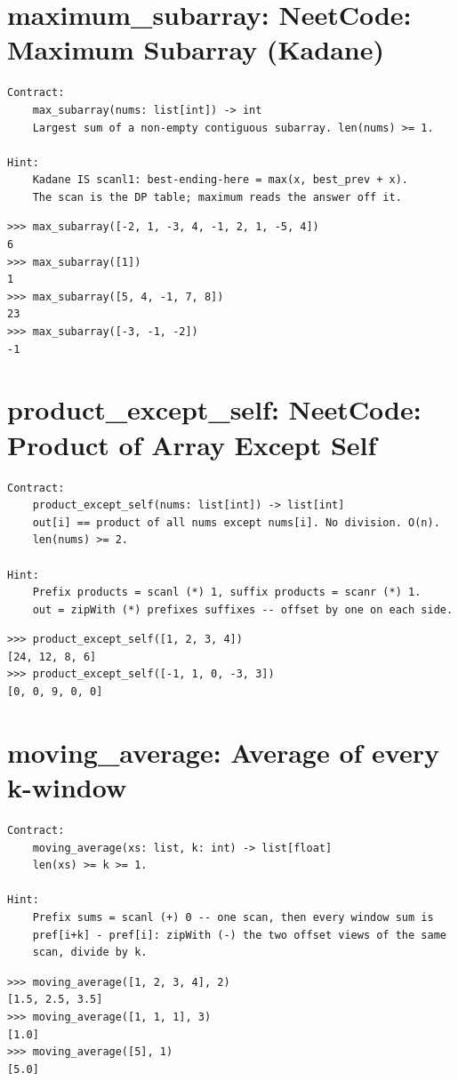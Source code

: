 \documentclass[10pt,letterpaper]{book}
\begin{document}
\section{maximum\_subarray: NeetCode: Maximum Subarray (Kadane)}
\begin{lstlisting}[style=ex]
Contract:
    max_subarray(nums: list[int]) -> int
    Largest sum of a non-empty contiguous subarray. len(nums) >= 1.

Hint:
    Kadane IS scanl1: best-ending-here = max(x, best_prev + x).
    The scan is the DP table; maximum reads the answer off it.
\end{lstlisting}
\begin{lstlisting}[style=ex]
>>> max_subarray([-2, 1, -3, 4, -1, 2, 1, -5, 4])
6
>>> max_subarray([1])
1
>>> max_subarray([5, 4, -1, 7, 8])
23
>>> max_subarray([-3, -1, -2])
-1
\end{lstlisting}

\section{product\_except\_self: NeetCode: Product of Array Except Self}
\begin{lstlisting}[style=ex]
Contract:
    product_except_self(nums: list[int]) -> list[int]
    out[i] == product of all nums except nums[i]. No division. O(n).
    len(nums) >= 2.

Hint:
    Prefix products = scanl (*) 1, suffix products = scanr (*) 1.
    out = zipWith (*) prefixes suffixes -- offset by one on each side.
\end{lstlisting}
\begin{lstlisting}[style=ex]
>>> product_except_self([1, 2, 3, 4])
[24, 12, 8, 6]
>>> product_except_self([-1, 1, 0, -3, 3])
[0, 0, 9, 0, 0]
\end{lstlisting}

\section{moving\_average: Average of every k-window}
\begin{lstlisting}[style=ex]
Contract:
    moving_average(xs: list, k: int) -> list[float]
    len(xs) >= k >= 1.

Hint:
    Prefix sums = scanl (+) 0 -- one scan, then every window sum is
    pref[i+k] - pref[i]: zipWith (-) the two offset views of the same
    scan, divide by k.
\end{lstlisting}
\begin{lstlisting}[style=ex]
>>> moving_average([1, 2, 3, 4], 2)
[1.5, 2.5, 3.5]
>>> moving_average([1, 1, 1], 3)
[1.0]
>>> moving_average([5], 1)
[5.0]
\end{lstlisting}
\end{document}
